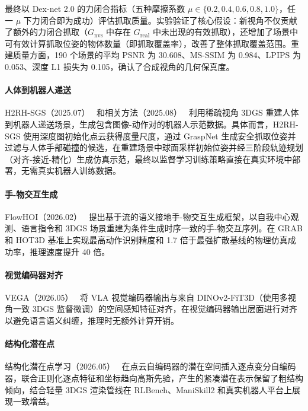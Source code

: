 最终以 Dex-net 2.0 的力闭合指标（五种摩擦系数 $\mu \in \{0.2, 0.4, 0.6, 0.8, 1.0\}$，任一 $\mu$ 下力闭合即为成功）评估抓取质量。实验验证了核心假设：新视角不仅贡献了额外的力闭合抓取（$G_\text{nvs}$ 中存在 $G_\text{real}$ 中未出现的有效抓取），还增加了场景中可有效计算抓取位姿的物体数量（即抓取覆盖率），改善了整体抓取覆盖范围。重建质量方面，190 个场景的平均 PSNR 为 30.608、MS-SSIM 为 0.984、LPIPS 为 0.053、深度 L1 损失为 0.105，确认了合成视角的几何保真度。

\paragraph{人体到机器人递送}

H2RH-SGS（2025.07）~\cite{2507_08726} 和相关方法（2025.08）~\cite{2508_09855} 利用稀疏视角 3DGS 重建人体到机器人递送场景，生成包含图像-动作对的机器人示范数据。具体而言，H2RH-SGS 使用深度图初始化点云获得度量尺度，通过 GraspNet 生成安全抓取位姿并过滤与人体手部碰撞的候选，在重建场景中球面采样初始位姿并经三阶段轨迹规划（对齐-接近-精化）生成仿真示范，最终以监督学习训练策略直接在真实环境中部署，无需真实机器人训练数据。

\paragraph{手-物交互生成}

FlowHOI（2026.02）~\cite{2602_13444} 提出基于流的语义接地手-物交互生成框架，以自我中心观测、语言指令和 3DGS 场景重建为条件生成时序一致的手-物交互序列。在 GRAB 和 HOT3D 基准上实现最高动作识别精度和 1.7 倍于最强扩散基线的物理仿真成功率，推理速度提升 40 倍。

\paragraph{视觉编码器对齐}

VEGA（2026.05）~\cite{2605_10485} 将 VLA 视觉编码器输出与来自 DINOv2-FiT3D（使用多视角一致 3DGS 监督微调）的空间感知特征对齐，在视觉编码器输出层面进行对齐以避免语言语义纠缠，推理时无额外计算开销。

\paragraph{结构化潜在点}

结构化潜在点学习（2026.05）~\cite{2605_21258} 在点云自编码器的潜在空间插入逐点变分自编码器，联合正则化逐点特征和坐标趋向高斯先验，产生的紧凑潜在表示保留了粗结构倾向，结合轻量 3DGS 渲染管线在 RLBench、ManiSkill2 和真实机器人平台上展现一致增益。

